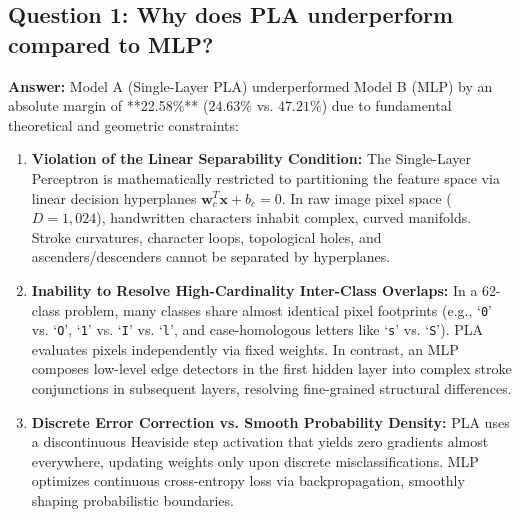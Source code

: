 \documentclass[12pt,a4paper]{article}
\begin{document}
\subsection{Question 1: Why does PLA underperform compared to MLP?}
\textbf{Answer:}
Model A (Single-Layer PLA) underperformed Model B (MLP) by an absolute margin of **22.58\%** ($24.63\%$ vs. $47.21\%$) due to fundamental theoretical and geometric constraints:
\begin{enumerate}[noitemsep]
    \item \textbf{Violation of the Linear Separability Condition:} The Single-Layer Perceptron is mathematically restricted to partitioning the feature space via linear decision hyperplanes $\mathbf{w}_c^T \mathbf{x} + b_c = 0$. In raw image pixel space ($D = 1,024$), handwritten characters inhabit complex, curved manifolds. Stroke curvatures, character loops, topological holes, and ascenders/descenders cannot be separated by hyperplanes.
    \item \textbf{Inability to Resolve High-Cardinality Inter-Class Overlaps:} In a 62-class problem, many classes share almost identical pixel footprints (e.g., `\texttt{0}' vs. `\texttt{O}', `\texttt{1}' vs. `\texttt{I}' vs. `\texttt{l}', and case-homologous letters like `\texttt{s}' vs. `\texttt{S}'). PLA evaluates pixels independently via fixed weights. In contrast, an MLP composes low-level edge detectors in the first hidden layer into complex stroke conjunctions in subsequent layers, resolving fine-grained structural differences.
    \item \textbf{Discrete Error Correction vs. Smooth Probability Density:} PLA uses a discontinuous Heaviside step activation that yields zero gradients almost everywhere, updating weights only upon discrete misclassifications. MLP optimizes continuous cross-entropy loss via backpropagation, smoothly shaping probabilistic boundaries.
\end{enumerate}
\end{document}
